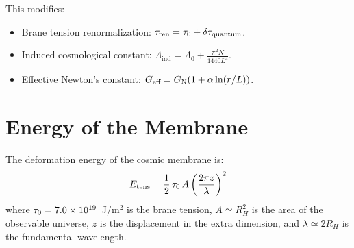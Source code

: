 This modifies:
\begin{itemize}
  \item Brane tension renormalization: $\tau_\text{ren} = \tau_0 + \delta\tau_\text{quantum}$.
  \item Induced cosmological constant: $\Lambda_\text{ind} = \Lambda_0 + \frac{\pi^2 N}{1440 L^4}$.
  \item Effective Newton's constant: $G_\text{eff} = G_\text{N}(1 + \alpha\ln(r/L))$.
\end{itemize}

\section{Energy of the Membrane}
\label{sec:membrane_energy}

The deformation energy of the cosmic membrane is:
\begin{equation}
E_\text{tens} = \frac{1}{2}\,\tau_0\,A\left(\frac{2\pi z}{\lambda}\right)^2
\end{equation}
where $\tau_0 = 7.0 \times 10^{19}$~J/m$^2$ is the brane tension, $A \simeq R_H^2$ is the area of the observable universe, $z$ is the displacement in the extra dimension, and $\lambda \simeq 2R_H$ is the fundamental wavelength.

